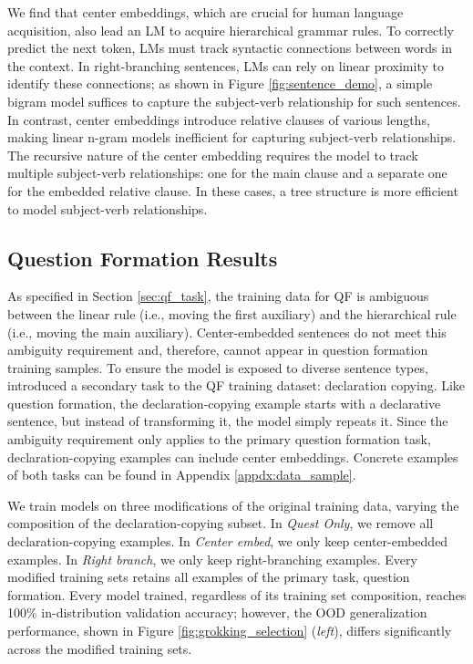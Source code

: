 We find that center embeddings, which are crucial for human language acquisition, also lead an LM to acquire hierarchical grammar rules. To correctly predict the next token, LMs must track syntactic connections between words in the context. In right-branching sentences, LMs can rely on linear proximity to identify these connections; as shown in Figure \ref{fig:sentence_demo}, a simple bigram model suffices to capture the subject-verb relationship for such sentences. In contrast, center embeddings introduce relative clauses of various lengths, making linear n-gram models inefficient for capturing subject-verb relationships. The recursive nature of the center embedding requires the model to track multiple subject-verb relationships: one for the main clause and a separate one for the embedded relative clause. In these cases, a tree structure is more efficient to model subject-verb relationships. 


\subsection{Question Formation Results}
\label{sec:qf_result}
As specified in Section \ref{sec:qf_task}, the training data for QF is ambiguous between the linear rule (i.e., moving the first auxiliary) and the hierarchical rule (i.e., moving the main auxiliary). Center-embedded sentences do not meet this ambiguity requirement and, therefore, cannot appear in question formation training samples. To ensure the model is exposed to diverse sentence types, \citet{McCoy2018-uv} introduced a secondary task to the QF training dataset: declaration copying. Like question formation, the declaration-copying example starts with a declarative sentence, but instead of transforming it, the model simply repeats it. Since the ambiguity requirement only applies to the primary question formation task, declaration-copying examples can include center embeddings. Concrete examples of both tasks can be found in Appendix \ref{appdx:data_sample}.


We train models on three modifications of the original training data, varying the composition of the declaration-copying subset. 
In \textit{Quest Only}, we remove all declaration-copying examples.
In \textit{Center embed}, we only keep center-embedded examples. In \textit{Right branch}, we only keep right-branching examples. 
Every modified training sets retains all examples of the primary task, question formation.
Every model trained, regardless of its training set composition, reaches 100\% in-distribution validation accuracy; however, the OOD generalization performance, shown in Figure \ref{fig:grokking_selection} (\textit{left}), differs significantly across the modified training sets. 

